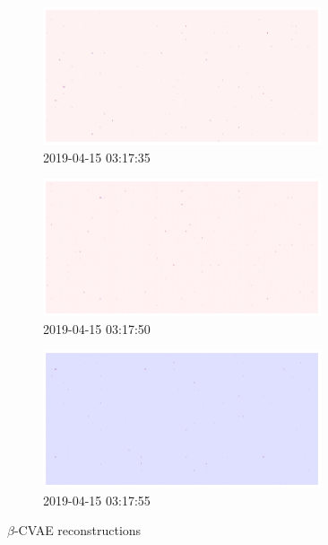 \clearpage
\begin{figure}[p]
\centering
\begin{subfigure}{\textwidth}
    \centering
    \includegraphics[width=0.9\textwidth]{figures/anomalies/cvae/20190415_031735.png}
    \caption{2019-04-15 03:17:35}
\end{subfigure}
\vspace{1em}
\begin{subfigure}{\textwidth}
    \centering
    \includegraphics[width=0.9\textwidth]{figures/anomalies/cvae/20190415_031750.png}
    \caption{2019-04-15 03:17:50}
\end{subfigure}
\vspace{1em}
\begin{subfigure}{\textwidth}
    \centering
    \includegraphics[width=0.9\textwidth]{figures/anomalies/cvae/20190415_031755.png}
    \caption{2019-04-15 03:17:55}
\end{subfigure}
\caption{$\beta$-CVAE reconstructions}
\label{fig:beta_cvae_reconstructions}
\end{figure}